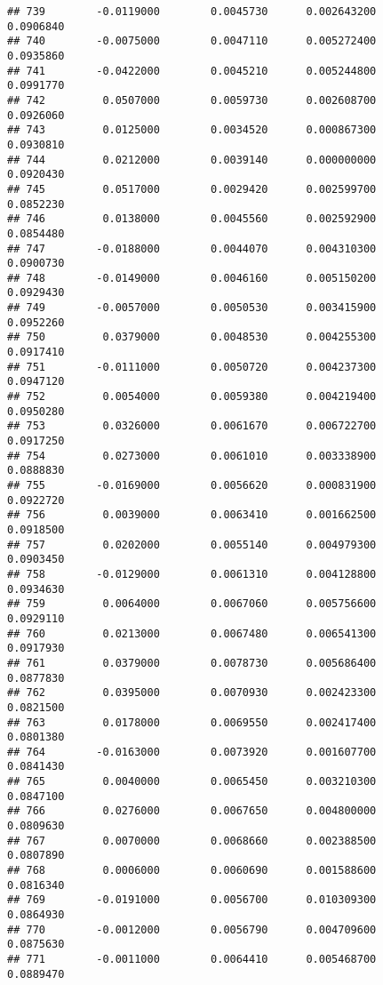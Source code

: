\documentclass[
]{article}
\begin{document}
\begin{verbatim}
## 739        -0.0119000        0.0045730      0.002643200             0.0906840
## 740        -0.0075000        0.0047110      0.005272400             0.0935860
## 741        -0.0422000        0.0045210      0.005244800             0.0991770
## 742         0.0507000        0.0059730      0.002608700             0.0926060
## 743         0.0125000        0.0034520      0.000867300             0.0930810
## 744         0.0212000        0.0039140      0.000000000             0.0920430
## 745         0.0517000        0.0029420      0.002599700             0.0852230
## 746         0.0138000        0.0045560      0.002592900             0.0854480
## 747        -0.0188000        0.0044070      0.004310300             0.0900730
## 748        -0.0149000        0.0046160      0.005150200             0.0929430
## 749        -0.0057000        0.0050530      0.003415900             0.0952260
## 750         0.0379000        0.0048530      0.004255300             0.0917410
## 751        -0.0111000        0.0050720      0.004237300             0.0947120
## 752         0.0054000        0.0059380      0.004219400             0.0950280
## 753         0.0326000        0.0061670      0.006722700             0.0917250
## 754         0.0273000        0.0061010      0.003338900             0.0888830
## 755        -0.0169000        0.0056620      0.000831900             0.0922720
## 756         0.0039000        0.0063410      0.001662500             0.0918500
## 757         0.0202000        0.0055140      0.004979300             0.0903450
## 758        -0.0129000        0.0061310      0.004128800             0.0934630
## 759         0.0064000        0.0067060      0.005756600             0.0929110
## 760         0.0213000        0.0067480      0.006541300             0.0917930
## 761         0.0379000        0.0078730      0.005686400             0.0877830
## 762         0.0395000        0.0070930      0.002423300             0.0821500
## 763         0.0178000        0.0069550      0.002417400             0.0801380
## 764        -0.0163000        0.0073920      0.001607700             0.0841430
## 765         0.0040000        0.0065450      0.003210300             0.0847100
## 766         0.0276000        0.0067650      0.004800000             0.0809630
## 767         0.0070000        0.0068660      0.002388500             0.0807890
## 768         0.0006000        0.0060690      0.001588600             0.0816340
## 769        -0.0191000        0.0056700      0.010309300             0.0864930
## 770        -0.0012000        0.0056790      0.004709600             0.0875630
## 771        -0.0011000        0.0064410      0.005468700             0.0889470

\end{verbatim}
\end{document}
